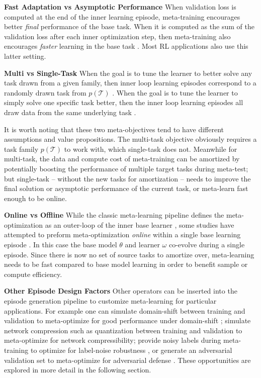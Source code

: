 \documentclass[10pt,journal,compsoc]{IEEEtran}
\newcommand{\keypoint}[1]{\vspace{0.1cm}\noindent\textbf{#1}\quad}
\begin{document}
\keypoint{Fast Adaptation vs Asymptotic Performance} When validation loss is computed at the end of the inner learning episode, meta-training encourages better \emph{final} performance of the base task. When it is computed as the sum of the validation loss after each inner optimization step, then meta-training also encourages \emph{faster} learning in the base task \cite{antoniou2018maml,wichrowska2017learnoptscalegen,bello2017neuraloptimizerrl}. Most RL applications also use this latter setting.

\keypoint{Multi vs Single-Task} When the goal is to tune the learner to better solve any task drawn from a given family, then inner loop learning episodes correspond to a randomly drawn task from $p(\mathcal{T})$ \cite{finn2017maml,li2019featurecritic,snell2017prototypicalnets}. When the goal is to tune the learner to simply solve one specific task better, then the inner loop learning episodes all draw data from the same underlying task \cite{xu2018metagradient,franceschi2017hyperopt,andrychowicz2016graddescgraddesc,zheng2018intrinsicrewardpg,veeriah2019discovery,meier2018onlinelearningrate}.

It is worth noting that these two meta-objectives tend to have different assumptions and value propositions. The multi-task objective obviously requires a task family $p(\mathcal{T})$ to work with, which single-task does not. Meanwhile for multi-task, the data and compute cost of meta-training can be amortized by potentially boosting the performance of multiple target tasks during meta-test; but single-task -- without the new tasks for amortization -- needs to improve the final solution or asymptotic performance of the current task, or meta-learn fast enough to be online.

\keypoint{Online vs Offline} While the classic meta-learning pipeline defines the meta-optimization as an outer-loop of the inner base learner \cite{finn2017maml,andrychowicz2016graddescgraddesc}, some studies have attempted to preform meta-optimization \emph{online} within a single base learning episode \cite{veeriah2019discovery,meier2018onlinelearningrate,li2019featurecritic, baydin2017hd}. In this case the base model $\theta$ and learner $\omega$ co-evolve during a single episode. Since there is now no set of source tasks to amortize over, meta-learning needs to be fast compared to base model learning in order to benefit sample or compute efficiency.

\keypoint{Other Episode Design Factors} Other operators can be inserted into the episode generation pipeline to customize meta-learning for particular applications. For example one can simulate domain-shift between training and validation to meta-optimize for good performance under domain-shift \cite{balaji2018metareg,li2019featurecritic,li2020metadomain}; simulate network compression such as quantization \cite{chen2019metaquant} between training and validation to meta-optimize for network compressibility; provide noisy labels during meta-training to optimize for label-noise robustness \cite{li2019learning}, or generate an adversarial validation set to meta-optimize for adversarial defense \cite{goldblum2019adversarially}. These opportunities are explored in more detail in the following section.
\end{document}
